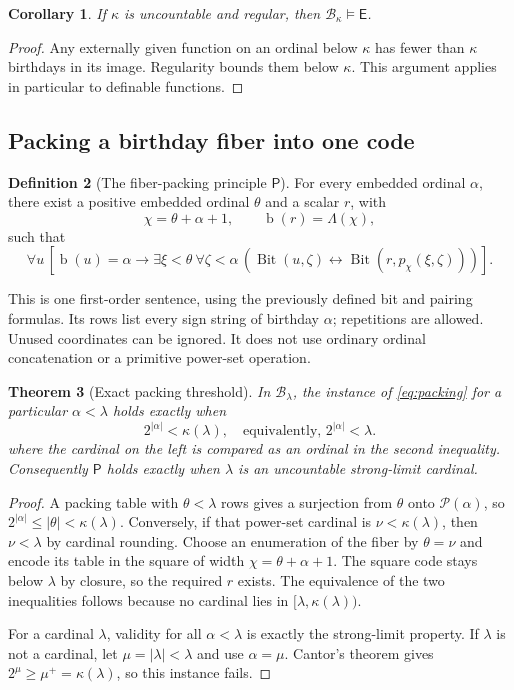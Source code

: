 \documentclass[11pt,letterpaper]{article}
\newtheorem{theorem}{Theorem}[section]
\newtheorem{corollary}[theorem]{Corollary}
\theoremstyle{definition}
\newtheorem{definition}[theorem]{Definition}
\theoremstyle{remark}
\newcommand{\bd}{\operatorname{b}}
\newcommand{\B}{\mathcal B}
\newcommand{\Bit}{\operatorname{Bit}}
\newcommand{\Etern}{\mathsf E}
\newcommand{\Pack}{\mathsf P}
\newcommand{\Pow}{\mathcal P}
\newcommand{\card}[1]{\lvert#1\rvert}
\begin{document}
\begin{corollary}
If $\kappa$ is uncountable and regular, then $\B_\kappa\models\Etern$.
\end{corollary}
\begin{proof}
Any externally given function on an ordinal below $\kappa$ has fewer than
$\kappa$ birthdays in its image. Regularity bounds them below $\kappa$.
This argument applies in particular to definable functions.
\end{proof}

\subsection{Packing a birthday fiber into one code}

\begin{definition}[The fiber-packing principle $\Pack$]
For every embedded ordinal $\alpha$, there exist a positive embedded ordinal
$\theta$ and a scalar $r$, with
\[
 \chi=\theta+\alpha+1,
 \qquad\bd(r)=\Lambda(\chi),
\]
such that
\begin{equation}
 \forall u\,[\bd(u)=\alpha\longrightarrow
   \exists\xi<\theta\ \forall\zeta<\alpha\,
    (\Bit(u,\zeta)\leftrightarrow\Bit(r,p_\chi(\xi,\zeta)))].
 \label{eq:packing}
\end{equation}
\end{definition}

This is one first-order sentence, using the previously defined bit and
pairing formulas. Its rows list every sign string of birthday $\alpha$;
repetitions are allowed. Unused coordinates can be ignored. It does not use
ordinary ordinal concatenation or a primitive power-set operation.

\begin{theorem}[Exact packing threshold]
\label{thm:packing}
In $\B_\lambda$, the instance of \eqref{eq:packing} for a particular
$\alpha<\lambda$ holds exactly when
\[
 2^{\card\alpha}<\kappa(\lambda),
 \quad\text{equivalently, }2^{\card\alpha}<\lambda.
\]
where the cardinal on the left is compared as an ordinal in the second
inequality. Consequently $\Pack$ holds exactly when $\lambda$ is an
uncountable strong-limit cardinal.
\end{theorem}
\begin{proof}
A packing table with $\theta<\lambda$ rows gives a surjection from $\theta$
onto $\Pow(\alpha)$, so $2^{\card\alpha}\le\card\theta<\kappa(\lambda)$.
Conversely, if that power-set cardinal is $\nu<\kappa(\lambda)$, then
$\nu<\lambda$ by cardinal rounding. Choose an enumeration of the fiber by
$\theta=\nu$ and encode its table in the square of width
$\chi=\theta+\alpha+1$. The square code stays below $\lambda$ by closure,
so the required $r$ exists. The equivalence of the two inequalities follows
because no cardinal lies in $[\lambda,\kappa(\lambda))$.

For a cardinal $\lambda$, validity for all $\alpha<\lambda$ is exactly the
strong-limit property. If $\lambda$ is not a cardinal, let
$\mu=\card\lambda<\lambda$ and use $\alpha=\mu$. Cantor's theorem gives
$2^\mu\ge\mu^+=\kappa(\lambda)$, so this instance fails.
\end{proof}
\end{document}
